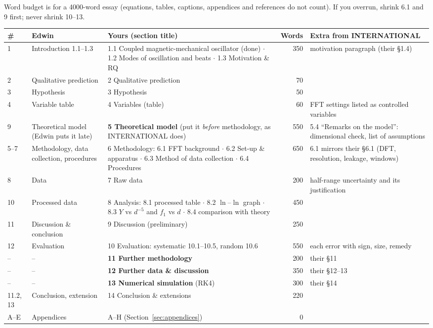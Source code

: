 \documentclass[11pt,a4paper]{article}
\newcommand{\Y}{Y}                                   %
\begin{document}
Word budget is for a 4000-word essay (equations, tables, captions, appendices and
references do not count). If you overrun, shrink 6.1 and 9 first; never shrink
10--13.

\begin{center}\small
\begin{tabular}{@{}p{0.8cm} p{2.9cm} p{6.5cm} r p{3.5cm}@{}}
\toprule
\# & Edwin & Yours (section title) & Words & Extra from INTERNATIONAL \\
\midrule
1 & Introduction 1.1--1.3 & 1.1 Coupled magnetic-mechanical oscillator (done) $\cdot$ 1.2 Modes of oscillation and beats $\cdot$ 1.3 Motivation \& RQ & 350 & motivation paragraph (their \S1.4) \\
2 & Qualitative prediction & 2 Qualitative prediction & 70 & \\
3 & Hypothesis & 3 Hypothesis & 50 & \\
4 & Variable table & 4 Variables (table) & 60 & FFT settings listed as controlled variables \\
9 & Theoretical model (Edwin puts it late) & \textbf{5 Theoretical model} (put it \emph{before} methodology, as INTERNATIONAL does) & 550 & 5.4 ``Remarks on the model'': dimensional check, list of assumptions \\
5--7 & Methodology, data collection, procedures & 6 Methodology: 6.1 FFT background $\cdot$ 6.2 Set-up \& apparatus $\cdot$ 6.3 Method of data collection $\cdot$ 6.4 Procedures & 650 & 6.1 mirrors their \S6.1 (DFT, resolution, leakage, windows) \\
8 & Data & 7 Raw data & 200 & half-range uncertainty and its justification \\
10 & Processed data & 8 Analysis: 8.1 processed table $\cdot$ 8.2 $\ln$--$\ln$ graph $\cdot$ 8.3 $\Y$ vs $d^{-5}$ and $f_1$ vs $d$ $\cdot$ 8.4 comparison with theory & 450 & \\
11 & Discussion \& conclusion & 9 Discussion (preliminary) & 250 & \\
12 & Evaluation & 10 Evaluation: systematic 10.1--10.5, random 10.6 & 550 & each error with sign, size, remedy \\
-- & -- & \textbf{11 Further methodology} & 200 & their \S11 \\
-- & -- & \textbf{12 Further data \& discussion} & 350 & their \S12--13 \\
-- & -- & \textbf{13 Numerical simulation} (RK4) & 300 & their \S14 \\
11.2, 13 & Conclusion, extension & 14 Conclusion \& extensions & 220 & \\
A--E & Appendices & A--H (Section~\ref{sec:appendices}) & 0 & \\
\bottomrule
\end{tabular}
\end{center}
\end{document}
